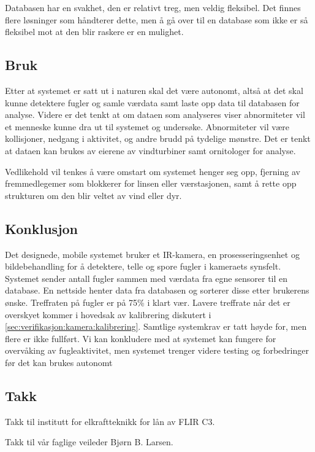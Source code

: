 Databasen har en svakhet, den er relativt treg, men veldig fleksibel. Det finnes flere løsninger som håndterer dette, men å gå over til en database som ikke er så fleksibel mot at den blir raskere er en mulighet. 


\subsection{Bruk}

Etter at systemet er satt ut i naturen skal det være autonomt, altså at det skal kunne detektere fugler og samle værdata samt laste opp data til databasen for analyse. Videre er det tenkt at om dataen som analyseres viser abnormiteter vil et menneske kunne dra ut til systemet og undersøke. Abnormiteter vil være kollisjoner, nedgang i aktivitet, og andre brudd på tydelige mønstre. Det er tenkt at dataen kan brukes av eierene av vindturbiner samt ornitologer for analyse. 

Vedlikehold vil tenkes å være omstart om systemet henger seg opp, fjerning av fremmedlegemer som blokkerer for linsen eller værstasjonen, samt å rette opp strukturen om den blir veltet av vind eller dyr. 

\subsection{Konklusjon}
Det designede, mobile systemet bruker et IR-kamera, en prosesseringsenhet og bildebehandling for å detektere, telle og spore fugler i kameraets synsfelt. Systemet sender antall fugler sammen med værdata fra egne sensorer til en database. En nettside henter data fra databasen og sorterer disse etter brukerens ønske. Treffraten på fugler er på 75\% i klart vær. Lavere treffrate når det er overskyet kommer i hovedsak av kalibrering diskutert i \autoref{sec:verifikasjon:kamera:kalibrering}. Samtlige systemkrav er tatt høyde for, men flere er ikke fullført.
Vi kan konkludere med at systemet kan fungere for overvåking av fugleaktivitet, men systemet trenger videre testing og forbedringer før det kan brukes autonomt





\subsection{Takk}

Takk til institutt for elkraftteknikk for lån av FLIR C3. 

Takk til vår faglige veileder Bjørn B. Larsen.